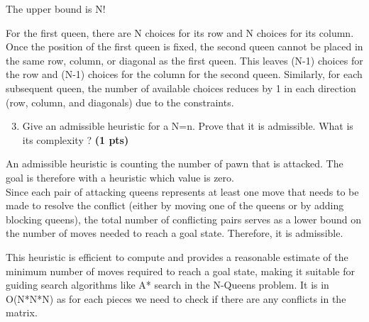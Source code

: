 \documentclass[11pt,a4paper]{report}
\begin{document}
\begin{answers}[5cm]
	The upper bound is N!
	
	\hspace{0.5cm}
	
	For the first queen, there are N choices for its row and N choices for its column. Once the position of the first queen is fixed, the second queen cannot be placed in the same row, column, or diagonal as the first queen. This leaves (N-1) choices for the row and (N-1) choices for the column for the second queen. Similarly, for each subsequent queen, the number of available choices reduces by 1 in each direction (row, column, and diagonals) due to the constraints.
\end{answers}



\begin{enumerate}
\setcounter{enumi}{2}
\item Give an admissible heuristic for a N=n. Prove that it is admissible. What is its complexity ? \textbf{(1 pts)}
\end{enumerate}

\begin{answers}[5cm]
	An admissible heuristic is counting the number of pawn that is attacked. The goal is therefore with a heuristic which value is zero.
	\\
	Since each pair of attacking queens represents at least one move that needs to be made to resolve the conflict (either by moving one of the queens or by adding blocking queens), the total number of conflicting pairs serves as a lower bound on the number of moves needed to reach a goal state. Therefore, it is admissible.
	
	\hspace{0.5cm}
	
	This heuristic is efficient to compute and provides a reasonable estimate of the minimum number of moves required to reach a goal state, making it suitable for guiding search algorithms like A* search in the N-Queens problem. It is in O(N*N*N) as for each pieces we need to check if there are any conflicts in the matrix.
\end{answers}
\end{document}
